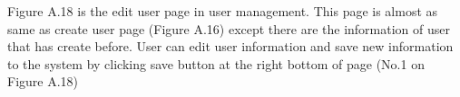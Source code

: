 \documentclass[12pt,oneside,openright,a4paper]{cpe-english-project}
\begin{document}
Figure A.18 is the edit user page in user management. This page is almost as same as 
create user page (Figure A.16) except there are the information of user that has create before. 
User can edit user information and save new information to the system by clicking save 
button at the right bottom of page (No.1 on Figure A.18)

\end{document}
